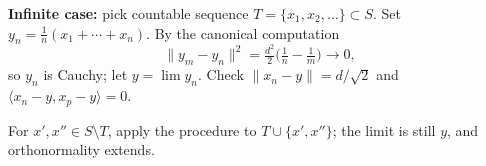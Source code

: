 \documentclass{article}
\begin{document}
\textbf{Infinite case:} pick countable sequence $T = \{x_1, x_2, \ldots\} \subset S$. Set $y_n = \tfrac{1}{n}(x_1 + \cdots + x_n)$. By the canonical computation
\[
\|y_m - y_n\|^2 = \tfrac{d^2}{2}\bigl(\tfrac{1}{n} - \tfrac{1}{m}\bigr) \to 0,
\]
so $y_n$ is Cauchy; let $y = \lim y_n$. Check $\|x_n - y\| = d/\sqrt 2$ and $\langle x_n - y, x_p - y\rangle = 0$.

For $x', x'' \in S \setminus T$, apply the procedure to $T \cup \{x', x''\}$; the limit is still $y$, and orthonormality extends.
\end{document}
